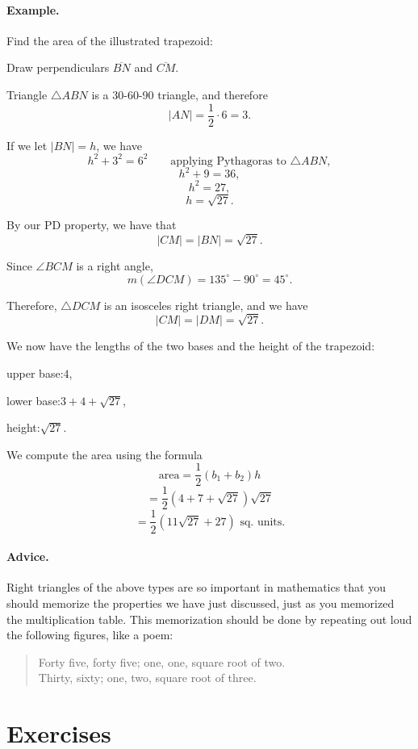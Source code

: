 \documentclass[12pt]{book} %
\begin{document}
\paragraph{Example.}
Find the area of the illustrated trapezoid:


Draw perpendiculars $\overline{BN}$ and $\overline{CM}$.


Triangle $\triangle ABN$ is a 30-60-90 triangle, and therefore
\[
|AN|=\frac12\cdot 6=3.
\]

If we let $|BN|=h$, we have
\[
h^2+3^2=6^2
\qquad \text{applying Pythagoras to }\triangle ABN,
\]
\[
h^2+9=36,
\]
\[
h^2=27,
\]
\[
h=\sqrt{27}.
\]

By our PD property, we have that
\[
|CM|=|BN|=\sqrt{27}.
\]

Since $\angle BCM$ is a right angle,
\[
m(\angle DCM)=135^\circ-90^\circ=45^\circ.
\]

Therefore, $\triangle DCM$ is an isosceles right triangle, and we have
\[
|CM|=|DM|=\sqrt{27}.
\]

We now have the lengths of the two bases and the height of the trapezoid:
\begin{center}
upper base:\qquad $4$,

lower base:\qquad $3+4+\sqrt{27}$,

height:\qquad $\sqrt{27}$.
\end{center}

We compute the area using the formula
\[
\text{area}=\frac12(b_1+b_2)h
\]
\[
=\frac12(4+7+\sqrt{27})\sqrt{27}
\]
\[
=\frac12(11\sqrt{27}+27)\text{ sq. units.}
\]

\paragraph{Advice.}
Right triangles of the above types are so important in mathematics that you should memorize the properties we have just discussed, just as you memorized the multiplication table. This memorization should be done by repeating out loud the following figures, like a poem:

\begin{quote}
Forty five, forty five; one, one, square root of two.\\
Thirty, sixty; one, two, square root of three.
\end{quote}

\section*{Exercises}
\end{document}
